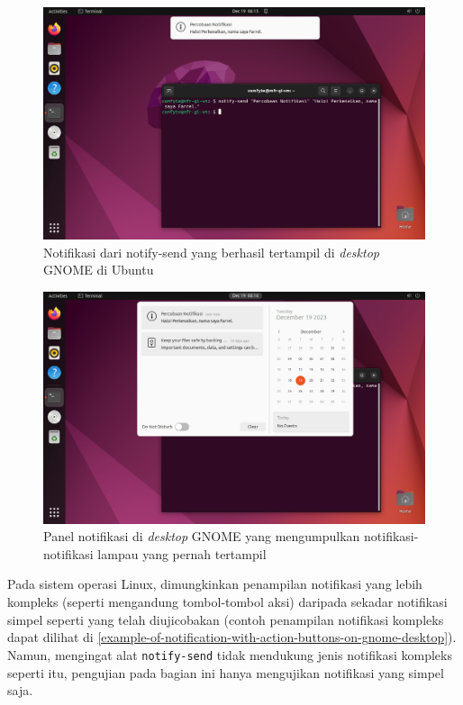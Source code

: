 \begin{figure}
    \centering
    \includegraphics[width=1\linewidth]{assets/Screenshot from 2023-12-19 06-15-10.png}
    \caption{Notifikasi dari notify-send yang berhasil tertampil di \textit{desktop} GNOME di Ubuntu}
    \label{ubuntu-notify-send-demo}
\end{figure}

\begin{figure}
    \centering
    \includegraphics[width=1\linewidth]{assets/Screenshot from 2023-12-19 06-16-29.png}
    \caption{Panel notifikasi di \textit{desktop} GNOME yang mengumpulkan notifikasi-notifikasi lampau yang pernah tertampil}
    \label{ubuntu-notification-panel}
\end{figure}

Pada sistem operasi Linux, dimungkinkan penampilan notifikasi yang lebih kompleks (seperti mengandung tombol-tombol aksi) daripada sekadar notifikasi simpel seperti yang telah diujicobakan (contoh penampilan notifikasi kompleks dapat dilihat di \autoref{example-of-notification-with-action-buttons-on-gnome-desktop}). Namun, mengingat alat \verb|notify-send| tidak mendukung jenis notifikasi kompleks seperti itu, pengujian pada bagian ini hanya mengujikan notifikasi yang simpel saja.

